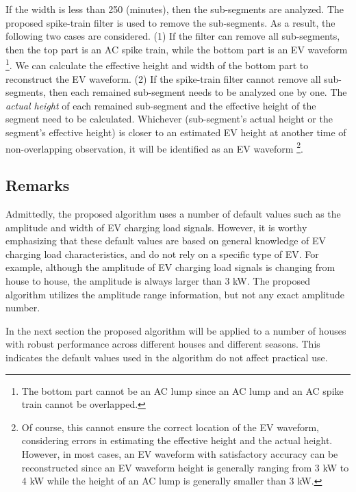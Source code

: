 \documentclass[conference]{IEEEtran}
\begin{document}
If the width is less than 250 (minutes), then the sub-segments  are analyzed. The proposed spike-train filter is used to remove the sub-segments. As a result, the following two cases are considered. (1) If the filter can remove all sub-segments, then the top part is an AC spike train, while the bottom part is an EV waveform \footnote{The bottom part cannot be an AC lump since an AC lump and an AC spike train cannot be overlapped.}. We can calculate the effective height and width of the bottom part to reconstruct the EV waveform. (2) If the spike-train filter cannot remove all sub-segments, then each remained sub-segment needs to be analyzed one by one. The \emph{actual height} of each remained sub-segment and the effective height of the segment need to be calculated. Whichever (sub-segment's actual height or the segment's effective height) is closer to an estimated EV height at another time of non-overlapping observation, it will be identified as an EV waveform \footnote{Of course, this cannot ensure the correct location of the EV waveform, considering errors in estimating the effective height and the actual height. However, in most cases, an EV waveform with satisfactory accuracy can be reconstructed since an EV waveform height is generally ranging from 3 kW to 4 kW while the height of an AC lump is generally smaller than 3 kW.}.










\subsection{Remarks}

Admittedly, the proposed algorithm uses a number of default values such as the amplitude and width of EV charging load signals. However, it is worthy emphasizing that these default values are based on general knowledge of EV charging load characteristics, and do not rely on a specific type of EV. For example, although the amplitude of EV charging load signals is changing from house to house, the amplitude is always larger than 3 kW. The proposed algorithm utilizes the amplitude range information, but not any exact amplitude number.

In the next section the proposed algorithm will be applied to a number of houses with robust performance across different houses and different seasons. This indicates the default values used in the algorithm do not affect practical use.
\end{document}
